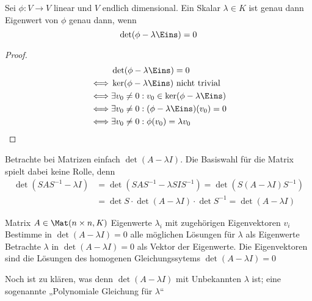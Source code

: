 \documentclass[a4paper, 10pt]{scrbook}
\begin{document}
\begin{prop}
\label{prop:10.4}
Sei $\phi:V\to V$ linear und $V$ endlich dimensional.
Ein Skalar $\lambda\in K$ ist genau dann Eigenwert von $\phi$ genau dann, wenn
\[
\det(\phi-\lambda\Eins)=0
\]
\begin{proof}
\begin{align*}
&\det(\phi-\lambda\Eins)=0\\
\iff& \ker(\phi-\lambda\Eins) \text{ nicht trivial}\\
\iff& \exists v_0\neq 0:v_0\in \ker(\phi-\lambda\Eins)\\
\iff& \exists v_0\neq 0:(\phi-\lambda\Eins)(v_0)=0\\
\iff& \exists v_0\neq 0:\phi(v_0)=\lambda v_0
\end{align*}
\end{proof}
\end{prop}

\begin{note}
Betrachte bei Matrizen einfach $\det(A-\lambda I)$.
Die Basiswahl für die Matrix spielt dabei keine Rolle, denn
\begin{align*}
\det(SAS^{-1}-\lambda I)&= \det(SAS^{-1}-\lambda SIS^{-1})=\det(S(A-\lambda I)S^{-1}) \\
&=\det S\cdot\det (A-\lambda I)\cdot \det S^{-1} = \det(A-\lambda I)
\end{align*}
\end{note}

\begin{alg*}
	\begin{algorithmic}
		\Input Matrix $A\in \Mat(n\times n,K)$
		\Output Eigenwerte $\lambda_i$ mit zugehörigen Eigenvektoren $v_i$
		\Statex
		\State Bestimme in $\det(A-\lambda I)=0$ alle möglichen Lösungen für $\lambda$ als Eigenwerte
		\State Betrachte $\lambda$ in $\det(A-\lambda I)=0$ als Vektor der Eigenwerte.
		\State Die Eigenvektoren sind die Lösungen des homogenen Gleichungssytems $\det(A-\lambda I)=0$
	\end{algorithmic}
\end{alg*}

\begin{note}
Noch ist zu klären, was denn $\det(A-\lambda I)$ mit Unbekannten $\lambda$ ist; eine sogenannte „Polynomiale Gleichung für $\lambda$“
\end{note}
\end{document}
